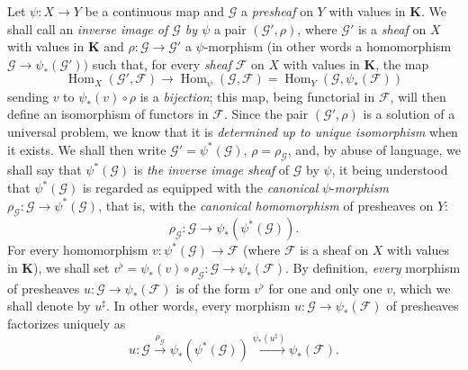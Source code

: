 \begin{env}[3.5.3]
\label{0.3.5.3}
Let $\psi:X\to Y$ be a continuous map and $\mathcal{G}$ a
\emph{presheaf} on $Y$ with values in $\boldsymbol{K}$. We shall call an
\emph{inverse image of $\mathcal{G}$ by $\psi$} a pair
$(\mathcal{G}',\rho)$, where $\mathcal{G}'$ is a \emph{sheaf} on $X$ with
values in $\boldsymbol{K}$ and
$\rho:\mathcal{G}\to\mathcal{G}'$ a $\psi$-morphism (in other words a
homomorphism $\mathcal{G}\to\psi_*(\mathcal{G}'))$ such that, for every
\emph{sheaf} $\mathcal{F}$ on $X$ with values in $\boldsymbol{K}$,
the map
\begin{equation*}
  \operatorname{Hom}_X(\mathcal{G}',\mathcal{F})
  \longrightarrow \operatorname{Hom}_\psi(\mathcal{G},\mathcal{F})
  =\operatorname{Hom}_Y(\mathcal{G},\psi_*(\mathcal{F}))
\tag{3.5.3.1}\label{0.3.5.3.1}
\end{equation*}
sending $v$ to $\psi_*(v)\circ\rho$ is a \emph{bijection}; this
map, being functorial in $\mathcal{F}$, will then define an
isomorphism of functors in $\mathcal{F}$. Since the pair
$(\mathcal{G}',\rho)$ is a solution of a universal problem, we know that it
is \emph{determined up to unique isomorphism} when it exists. We shall
then write $\mathcal{G}'=\psi^*(\mathcal{G})$, $\rho=\rho_{\mathcal{G}}$, and, by
abuse of language, we shall say that $\psi^*(\mathcal{G})$ is \emph{the inverse
image sheaf} of $\mathcal{G}$ by $\psi$, it being understood that
$\psi^*(\mathcal{G})$ is regarded as equipped with the \emph{canonical}
$\psi$-\emph{morphism}
$\rho_{\mathcal{G}}:\mathcal{G}\to\psi^*(\mathcal{G})$, that is, with
the \emph{canonical homomorphism} of presheaves on $Y$:
\begin{equation*}
  \rho_{\mathcal{G}}:\mathcal{G}\to\psi_*(\psi^*(\mathcal{G})).
\tag{3.5.3.2}\label{0.3.5.3.2}
\end{equation*}
For every homomorphism
$v:\psi^*(\mathcal{G})\to\mathcal{F}$ (where $\mathcal{F}$ is a sheaf on
$X$ with values in $\boldsymbol{K}$), we shall set
$v^\flat=\psi_*(v)\circ\rho_{\mathcal{G}}:
\mathcal{G}\to\psi_*(\mathcal{F})$. By definition, \emph{every} morphism of
presheaves $u:\mathcal{G}\to\psi_*(\mathcal{F})$ is of the form $v^\flat$ for
one and only one $v$, which we shall denote by $u^\sharp$. In other words, every
morphism $u:\mathcal{G}\to\psi_*(\mathcal{F})$ of presheaves factorizes
uniquely as
\begin{equation*}
  u:\mathcal{G}\xrightarrow{\rho_{\mathcal{G}}}
  \psi_*(\psi^*(\mathcal{G}))
  \xrightarrow{\psi_*(u^\sharp)}\psi_*(\mathcal{F}).
\tag{3.5.3.3}\label{0.3.5.3.3}
\end{equation*}
\end{env}

